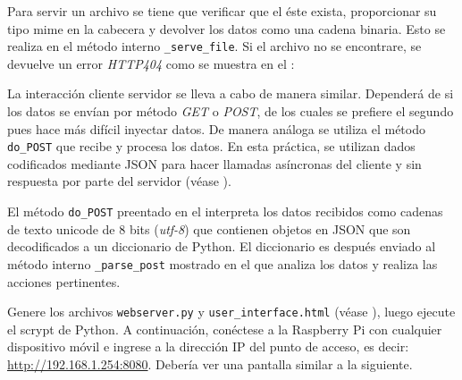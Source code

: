 \documentclass[letterpaper,10.5pt]{article}
\begin{document}


Para servir un archivo se tiene que verificar que el éste exista, proporcionar su tipo mime en la cabecera y devolver los datos como una cadena binaria.
Esto se realiza en el método interno \texttt{\_serve\_file}.
Si el archivo no se encontrare, se devuelve un error \emph{HTTP404} como se muestra en el :



\clearpage{}
La interacción cliente servidor se lleva a cabo de manera similar.
Dependerá de si los datos se envían por método \emph{GET} o \emph{POST}, de los cuales se prefiere el segundo pues hace más difícil inyectar datos.
De manera análoga se utiliza el método \texttt{do\_POST} que recibe y procesa los datos.
En esta práctica, se utilizan dados codificados mediante JSON para hacer llamadas asíncronas del cliente y sin respuesta por parte del servidor (véase ).



El método \texttt{do\_POST} preentado en el  interpreta los datos recibidos como cadenas de texto unicode de 8 bits (\emph{utf-8}) que contienen objetos en JSON que son decodificados a un diccionario de Python.
El diccionario es después enviado al método interno \texttt{\_parse\_post} mostrado en el  que analiza los datos y realiza las acciones pertinentes.



Genere los archivos \texttt{webserver.py} y \texttt{user\_interface.html} (véase ), luego ejecute el scrypt de Python.
A continuación, conéctese a la Raspberry Pi con cualquier dispositivo móvil e ingrese a la dirección IP del punto de acceso, es decir: \url{http://192.168.1.254:8080}.
Debería ver una pantalla similar a la siguiente.
\end{document}
